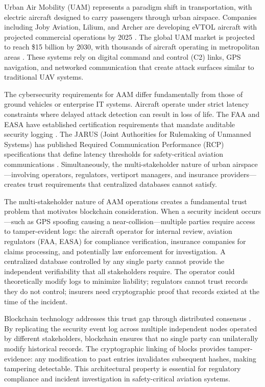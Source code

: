 \documentclass[conference]{IEEEtran}
\begin{document}
Urban Air Mobility (UAM) represents a paradigm shift in transportation, with electric aircraft designed to carry passengers through urban airspace. Companies including Joby Aviation, Lilium, and Archer are developing eVTOL aircraft with projected commercial operations by 2025 \cite{straubinger2020}. The global UAM market is projected to reach \$15 billion by 2030, with thousands of aircraft operating in metropolitan areas \cite{pak2024}. These systems rely on digital command and control (C2) links, GPS navigation, and networked communication that create attack surfaces similar to traditional UAV systems.

The cybersecurity requirements for AAM differ fundamentally from those of ground vehicles or enterprise IT systems. Aircraft operate under strict latency constraints where delayed attack detection can result in loss of life. The FAA and EASA have established certification requirements that mandate auditable security logging \cite{faa2023}. The JARUS (Joint Authorities for Rulemaking of Unmanned Systems) has published Required Communication Performance (RCP) specifications that define latency thresholds for safety-critical aviation communications \cite{jarus2023}. Simultaneously, the multi-stakeholder nature of urban airspace---involving operators, regulators, vertiport managers, and insurance providers---creates trust requirements that centralized databases cannot satisfy.

The multi-stakeholder nature of AAM operations creates a fundamental trust problem that motivates blockchain consideration. When a security incident occurs---such as GPS spoofing causing a near-collision---multiple parties require access to tamper-evident logs: the aircraft operator for internal review, aviation regulators (FAA, EASA) for compliance verification, insurance companies for claims processing, and potentially law enforcement for investigation. A centralized database controlled by any single party cannot provide the independent verifiability that all stakeholders require. The operator could theoretically modify logs to minimize liability; regulators cannot trust records they do not control; insurers need cryptographic proof that records existed at the time of the incident.

Blockchain technology addresses this trust gap through distributed consensus \cite{reisman2019}. By replicating the security event log across multiple independent nodes operated by different stakeholders, blockchain ensures that no single party can unilaterally modify historical records. The cryptographic linking of blocks provides tamper-evidence: any modification to past entries invalidates subsequent hashes, making tampering detectable. This architectural property is essential for regulatory compliance and incident investigation in safety-critical aviation systems.
\end{document}
